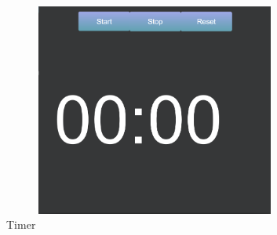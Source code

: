 \begin{figure}[!h]
\begin{center}
\includegraphics[width=10cm, height=7cm]{figures/timer}
\end{center}
\caption{Timer}
\label{fig:timer}
\end{figure}

